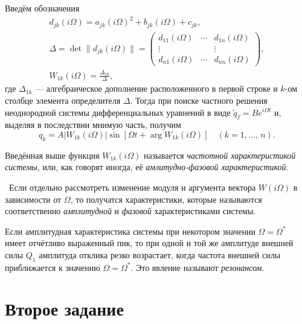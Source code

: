 \documentclass[a4paper,12pt]{article}
\begin{document}
Введём обозначения
\begin{gather*}
	d_{jk}(i\Omega)=a_{jk}(i\Omega)^2+b_{jk}(i\Omega)+c_{jk},\\
	\Delta=\det \|d_{jk}(i\Omega)\|=\begin{pmatrix} d_{11}(i\Omega) &
	\cdots & d_{1n}(i\Omega) \\ \vdots & & \vdots \\ d_{n1}(i\Omega) &
\cdots & d_{nn}(i\Omega)\end{pmatrix} ,\\
W_{1k}(i\Omega)=\frac{\Delta_{1k}}{\Delta},
\end{gather*}
где  $\Delta_{1k}$ --- алгебраическое дополнение расположенного в первой строке
и $k$-ом столбце  элемента определителя $\Delta$.
Тогда при поиске частного решения неоднородной системы дифференциальных уравнений
в виде $\tilde{q}_f=B e ^{i\Omega t}$ и, выделяя в последствии мнимую часть,
получим
\[
	q_k=A |W_{1k}(i\Omega)|\sin[\Omega t +\arg W_{1k}(i\Omega)]
	\quad (k=1,\ldots,\,n)
.\]
\begin{dfn}
	Введённая выше функция $W_{1k}(i\Omega)$ называется \emph{частотной
	характеристикой системы}, или, как говорят иногда, её
	\emph{амлитудно-фазовой
характеристикой}.
\end{dfn}
\begin{dfn}
	 Если отдельно рассмотреть изменение модуля и аргумента вектора
	$W(i\Omega)$ в зависимости от $\Omega$, то получатся характеристики,
	которые называются соответственно \emph{амплитудной} и \emph{фазовой}
	характеристиками системы.
\end{dfn}
\begin{dfn}
	Если амплитудная характеристика системы при некотором значении $\Omega=
	\Omega^*$ 
	имеет отчётливо выраженный пик, то при одной и той же амплитуде
	внешней силы $Q_1$ амплитуда отклика резко возрастает, когда частота
	внешней силы  приближается к значению $\Omega=\Omega^*$. Это явление
	называют \emph{резонансом}.
\end{dfn}
\section{Второе задание}
\end{document}
